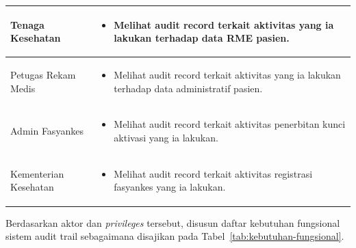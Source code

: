 \begin{xltabular}{\textwidth}{|>{\raggedright\arraybackslash}p{3.2cm}|X|}
    Tenaga Kesehatan &
    \begin{itemize}
        \item Melihat audit record terkait aktivitas yang ia lakukan terhadap data RME pasien.
    \end{itemize} \\
    \hline

    Petugas Rekam Medis &
    \begin{itemize}
        \item Melihat audit record terkait aktivitas yang ia lakukan terhadap data administratif pasien.
    \end{itemize} \\
    \hline

    Admin Fasyankes &
    \begin{itemize}
        \item Melihat audit record terkait aktivitas penerbitan kunci aktivasi yang ia lakukan.
    \end{itemize} \\
    \hline

    Kementerian Kesehatan &
    \begin{itemize}
        \item Melihat audit record terkait aktivitas registrasi fasyankes yang ia lakukan.
    \end{itemize} \\
    \hline

\end{xltabular}

Berdasarkan aktor dan \textit{privileges} tersebut, disusun daftar kebutuhan fungsional sistem audit trail sebagaimana disajikan pada Tabel~\ref{tab:kebutuhan-fungsional}.

